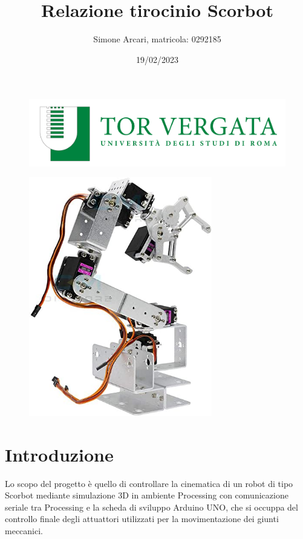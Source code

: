 \documentclass[a4paper]{article}
\begin{document}
    
    \begin{figure}
        \centering
        \includegraphics[width=15cm]{images/Logo.png}
    \end{figure}
    
    \begin{figure}
        \centering
        \includegraphics[width=8cm]{images/braccio_robotico.jpg}
    \end{figure}
    
    \title{\textbf{Relazione tirocinio Scorbot}}
    \author{Simone Arcari, matricola: 0292185}
    \date{19/02/2023}
    
    \maketitle
    \newpage
    \tableofcontents
    \newpage
    
    \section{Introduzione}
    
    \begin{text}
        Lo scopo del progetto è quello di controllare la cinematica di un robot di tipo Scorbot mediante simulazione 3D in ambiente Processing con comunicazione seriale tra Processing e la scheda di sviluppo Arduino UNO, che si occuppa del controllo finale degli attuattori utilizzati per la movimentazione dei giunti meccanici. 
    \end{text}
    
\end{document}
